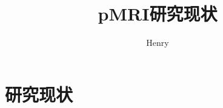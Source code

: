 \documentclass[11pt]{article}
\title{pMRI研究现状}
\author{Henry}
\begin{document}
	\maketitle 
	\section{研究现状}
	
	\section{}
	
\end{document}
